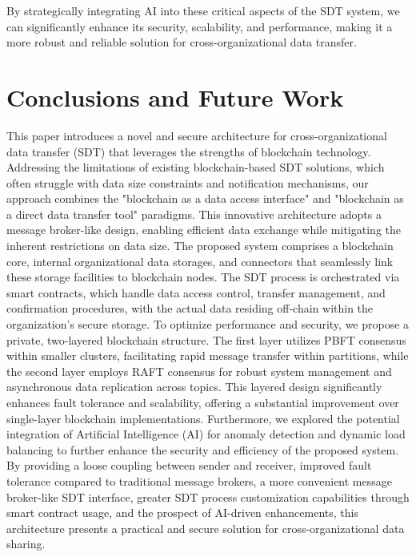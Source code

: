 \documentclass[10pt]{llncs}
\begin{document}
By strategically integrating AI into these critical aspects of the SDT system, we can significantly enhance its security, scalability, and performance, making it a more robust and reliable solution for cross-organizational data transfer.

\section{Conclusions and Future Work} \label{summary}

This paper introduces a novel and secure architecture for cross-organizational data transfer (SDT) that leverages the strengths of blockchain technology. 
Addressing the limitations of existing blockchain-based SDT solutions, which often struggle with data size constraints and notification mechanisms, our approach combines the "blockchain as a data access interface" and "blockchain as a direct data transfer tool" paradigms. 
This innovative architecture adopts a message broker-like design, enabling efficient data exchange while mitigating the inherent restrictions on data size. 
The proposed system comprises a blockchain core, internal organizational data storages, and connectors that seamlessly link these storage facilities to blockchain nodes. 
The SDT process is orchestrated via smart contracts, which handle data access control, transfer management, and confirmation procedures, with the actual data residing off-chain within the organization's secure storage. 
To optimize performance and security, we propose a private, two-layered blockchain structure. 
The first layer utilizes PBFT consensus within smaller clusters, facilitating rapid message transfer within partitions, while the second layer employs RAFT consensus for robust system management and asynchronous data replication across topics.
This layered design significantly enhances fault tolerance and scalability, offering a substantial improvement over single-layer blockchain implementations. 
Furthermore, we explored the potential integration of Artificial Intelligence (AI) for anomaly detection and dynamic load balancing to further enhance the security and efficiency of the proposed system.
By providing a loose coupling between sender and receiver, improved fault tolerance compared to traditional message brokers, a more convenient message broker-like SDT interface, greater SDT process customization capabilities through smart contract usage, and the prospect of AI-driven enhancements,
this architecture presents a practical and secure solution for cross-organizational data sharing.
\end{document}
